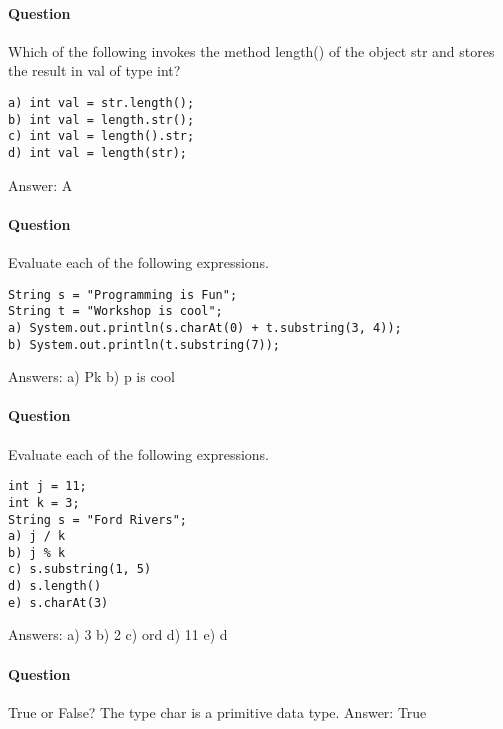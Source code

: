 \documentclass{article}
\begin{document}
\addtocounter{question_num}{1}
\paragraph{Question }
Which of the following invokes the method length() of the object str and stores the result in val of type int?
\begin{lstlisting}
a) int val = str.length();
b) int val = length.str();
c) int val = length().str;
d) int val = length(str);
\end{lstlisting}
{\color{red}Answer: A}

\addtocounter{question_num}{1}
\paragraph{Question }
Evaluate each of the following expressions.
\begin{lstlisting}
String s = "Programming is Fun";
String t = "Workshop is cool";
a) System.out.println(s.charAt(0) + t.substring(3, 4));
b) System.out.println(t.substring(7));
\end{lstlisting}
{\color{red}Answers:
\newline a) Pk
\newline b) p is cool}

\addtocounter{question_num}{1}
\paragraph{Question }
Evaluate each of the following expressions.
\begin{lstlisting}
int j = 11;
int k = 3;
String s = "Ford Rivers";
a) j / k
b) j % k
c) s.substring(1, 5)
d) s.length()
e) s.charAt(3)
\end{lstlisting}
{\color{red}Answers:
\newline a) 3
\newline b) 2
\newline c) ord
\newline d) 11
\newline e) d
}

\addtocounter{question_num}{1}
\paragraph{Question }
True or False? The type char is a primitive data type.
{\color{red}Answer: True}

\addtocounter{question_num}{1}
\end{document}
